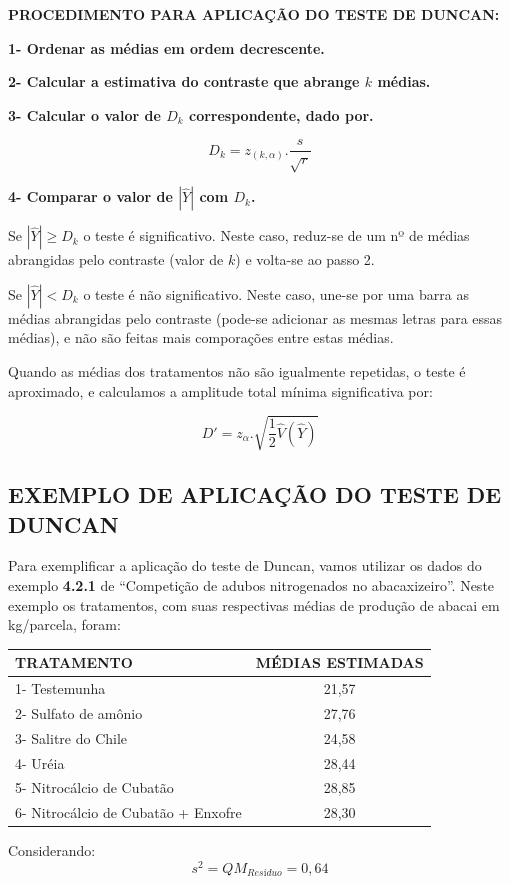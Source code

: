 \documentclass[
]{book}
\begin{document}
\textbf{PROCEDIMENTO PARA APLICAÇÃO DO TESTE DE DUNCAN:}

\textbf{1- Ordenar as médias em ordem decrescente.}

\textbf{2- Calcular a estimativa do contraste que abrange \(k\) médias.}

\textbf{3- Calcular o valor de \(D_k\) correspondente, dado por.}

\[
 D_{k}= z_{(k,\alpha)} . \frac{s}{\sqrt{r}}
\]

\textbf{4- Comparar o valor de \(|\hat{Y}|\) com \(D_k\).}

Se \(|\hat{Y}| \ge D_k\) o teste é significativo. Neste caso, reduz-se de um nº de médias abrangidas pelo contraste (valor de \(k\)) e volta-se ao passo 2.

Se \(|\hat{Y}| < D_k\) o teste é não significativo. Neste caso, une-se por uma barra as médias abrangidas pelo contraste (pode-se adicionar as mesmas letras para essas médias), e não são feitas mais comporações entre estas médias.

Quando as médias dos tratamentos não são igualmente repetidas, o teste é aproximado, e calculamos a amplitude total mínima significativa por:

\[
D' = z_\alpha . \sqrt{\frac{1}{2} \hat{V}(\hat{Y})}
\]

\hypertarget{exemplo-de-aplicauxe7uxe3o-do-teste-de-duncan}{%
\subsection{EXEMPLO DE APLICAÇÃO DO TESTE DE DUNCAN}\label{exemplo-de-aplicauxe7uxe3o-do-teste-de-duncan}}

Para exemplificar a aplicação do teste de Duncan, vamos utilizar os dados do exemplo \textbf{4.2.1} de ``Competição de adubos nitrogenados no abacaxizeiro''. Neste exemplo os tratamentos, com suas respectivas médias de produção de abacai em kg/parcela, foram:

\begin{longtable}[]{@{}lc@{}}
\toprule
TRATAMENTO & MÉDIAS ESTIMADAS\tabularnewline
\midrule
\endhead
1- Testemunha & 21,57\tabularnewline
2- Sulfato de amônio & 27,76\tabularnewline
3- Salitre do Chile & 24,58\tabularnewline
4- Uréia & 28,44\tabularnewline
5- Nitrocálcio de Cubatão & 28,85\tabularnewline
6- Nitrocálcio de Cubatão + Enxofre & 28,30\tabularnewline
\bottomrule
\end{longtable}

Considerando:
\[
s^2 = QM_{Resíduo} = 0,64
\]
\end{document}
